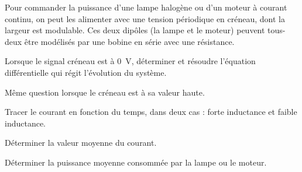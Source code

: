

Pour commander la puissance d'une lampe halogène ou d'un moteur à courant continu, on peut les alimenter avec une tension périodique en créneau, dont la largeur est modulable. Ces deux dipôles (la lampe et le moteur) peuvent tous-deux être modélisés par une bobine en série avec une résistance.

\question Lorsque le signal créneau est à \SI{0}{V}, déterminer et résoudre l'équation différentielle qui régit l'évolution du système.

\question Même question lorsque le créneau est à sa valeur haute.

\question Tracer le courant en fonction du temps, dans deux cas : forte inductance et faible inductance.

\question Déterminer la valeur moyenne du courant.

\question Déterminer la puissance moyenne consommée par la lampe ou le moteur.

